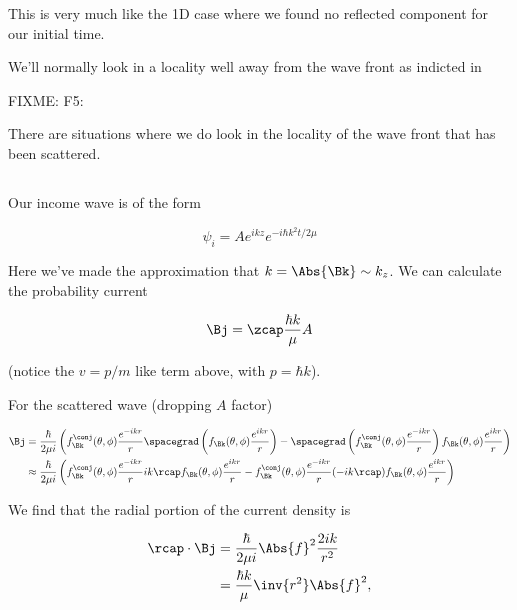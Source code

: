 This is very much like the 1D case where we found no reflected component for our initial time.

We'll normally look in a locality well away from the wave front as indicted in

FIXME: F5:

There are situations where we do look in the locality of the wave front that has been scattered.

\subsection{}

Our income wave is of the form

\begin{equation}\label{eqn:qmTwoL24:n}
\psi_i = A e^{i k z} e^{-i \hbar k^2 t/2 \mu}
\end{equation}

Here we've made the approximation that $k = \Abs{\Bk} \sim k_z$.  We can calculate the probability current

\begin{equation}\label{eqn:qmTwoL24:n}
\Bj = \zcap \frac{\hbar k}{\mu} A
\end{equation}

(notice the $v = p/m$ like term above, with $p = \hbar k$).

For the scattered wave (dropping $A$ factor)

\begin{align*}
\Bj &=
\frac{\hbar}{2 \mu i}
\left(
f_\Bk^\conj(\theta, \phi) \frac{e^{-i k r}}{r} \spacegrad \left(
f_\Bk(\theta, \phi) \frac{e^{i k r}}{r}
\right)
-
\spacegrad \left(
f_\Bk^\conj(\theta, \phi) \frac{e^{-i k r}}{r}
\right)
f_\Bk(\theta, \phi) \frac{e^{i k r}}{r}
\right)
\\
&\approx
\frac{\hbar}{2 \mu i}
\left(
f_\Bk^\conj(\theta, \phi) \frac{e^{-i k r}}{r} i k \rcap f_\Bk(\theta, \phi)
\frac{e^{i k r}}{r}
-
f_\Bk^\conj(\theta, \phi) \frac{e^{-i k r}}{r} (-i k \rcap) f_\Bk(\theta, \phi)
\frac{e^{i k r}}{r}
\right)
\end{align*}

We find that the radial portion of the current density is

\begin{align*}
\rcap \cdot \Bj
&= \frac{\hbar}{2 \mu i} \Abs{f}^2 \frac{ 2 i k }{r^2} \\
&= \frac{\hbar k}{\mu} \inv{r^2} \Abs{f}^2,
\end{align*}


